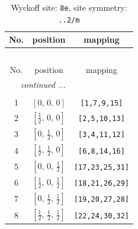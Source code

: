 \documentclass[fleqn,8pt]{jsarticle}
\begin{document}
\renewcommand{\arraystretch}{1.2}
\begin{longtable}{ccc}
\caption{Wyckoff site: {\tt 8e}, site symmetry: {\tt ..2/m}}
 \\
 \hline \hline
No. & position & mapping \\ \hline \endfirsthead

\multicolumn{2}{l}{\tablename\ \thetable{}} \\
 \hline \hline
No. & position & mapping \\ \hline \endhead

 \hline \hline
\multicolumn{2}{r}{\footnotesize\it continued ...} \\ \endfoot

 \hline \hline
\multicolumn{2}{r}{} \\ \endlastfoot

1 & $\left[ 0,\, 0,\, 0 \right]$ & {\tt [1,7,9,15]} \\ \hline
2 & $\left[ \frac{1}{2},\, 0,\, 0 \right]$ & {\tt [2,5,10,13]} \\ \hline
3 & $\left[ 0,\, \frac{1}{2},\, 0 \right]$ & {\tt [3,4,11,12]} \\ \hline
4 & $\left[ \frac{1}{2},\, \frac{1}{2},\, 0 \right]$ & {\tt [6,8,14,16]} \\ \hline
5 & $\left[ 0,\, 0,\, \frac{1}{2} \right]$ & {\tt [17,23,25,31]} \\ \hline
6 & $\left[ \frac{1}{2},\, 0,\, \frac{1}{2} \right]$ & {\tt [18,21,26,29]} \\ \hline
7 & $\left[ 0,\, \frac{1}{2},\, \frac{1}{2} \right]$ & {\tt [19,20,27,28]} \\ \hline
8 & $\left[ \frac{1}{2},\, \frac{1}{2},\, \frac{1}{2} \right]$ & {\tt [22,24,30,32]} \\
\end{longtable}
\renewcommand{\arraystretch}{1.2}
\end{document}

